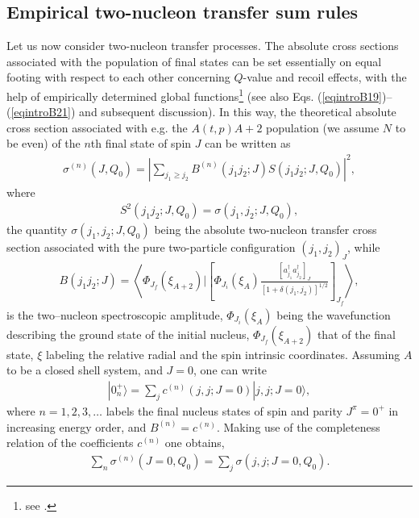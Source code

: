 \subsection{Empirical two-nucleon transfer sum rules}\label{S2.2.1}
Let us now consider two-nucleon transfer  processes. The  absolute cross sections associated with the population of  final states can be set essentially on equal footing with respect to each other  concerning  $Q$-value and recoil effects, with the help of empirically determined global functions\footnote{see \cite{Broglia:72b}.} (see also Eqs. (\ref{eqintroB19})--(\ref{eqintroB21}) and subsequent discussion). In this way, the theoretical absolute cross section associated with e.g. the $A(t,p)A+2$ population (we assume $N$ to be even) of the $n$th final state of spin $J$  can be written as 
\begin{align}
\sigma^{(n)}(J,Q_0)=\left|\sum_{j_1\geq j_2}B^{(n)}(j_1 j_2;J)S(j_1 j_2 ;J,Q_0)\right|^2,
\end{align}
where
\begin{align}
S^2(j_1 j_2 ;J,Q_0)=\sigma(j_1,j_2;J,Q_0),
\end{align}
the quantity $\sigma(j_1,j_2;J,Q_0)$ being the absolute two-nucleon transfer cross section associated with the pure two-particle configuration $(j_1,j_2)_J$, while
\begin{align}
B(j_1j_2;J)=\left\langle \Phi_{J_f}(\xi_{A+2})|\left[\Phi_{J_i}(\xi_A)\frac{\left[a^\dagger_{j_1}a^\dagger_{j_2}\right]_J}{\left[1+\delta(j_1,j_2)\right]^{1/2}}\right]_{J_f}\right\rangle,
\end{align}
is the two--nucleon spectroscopic amplitude, $\Phi_{J_i}(\xi_A)$ being the wavefunction describing the ground state of the initial nucleus, $\Phi_{J_f}(\xi_{A+2})$ that of the final state, $\xi$ labeling the relative radial and the spin intrinsic coordinates. Assuming $A$ to be a closed shell system, and $J=0$, one can write
\begin{align}
|0^+_n\rangle=\sum_{j}c^{(n)}(j,j;J=0)|j,j;J=0\rangle,
\end{align}
where $n=1,2,3,\dots$ labels the final nucleus states of spin and parity $J^\pi=0^+$ in increasing energy order, and $B^{(n)}=c^{(n)}$. Making use of the completeness relation of the coefficients $c^{(n)}$ one obtains,
\begin{align}\label{eqintro12}
\sum_n \sigma^{(n)}(J=0,Q_0)=\sum_j\sigma(j,j;J=0,Q_0).
\end{align}
